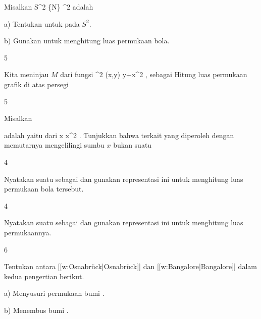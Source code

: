 {}
{

Misalkan
\maabbdisp {\alpha} {S^2 \setminus \{N\}} { \R^2
} {}
adalah

a) Tentukan
\mathl{\alpha_* \omega}{} untuk
pada $S^2$.

b) Gunakan
\mathl{\alpha_* \omega}{} untuk menghitung luas permukaan bola.

}
{} {}


{5}
{

Kita meninjau
$M$ dari fungsi
\maabbeledisp {\psi} {\R^2} {\R
} {(x,y)} { y+x^2
} {,}
sebagai
Hitung luas permukaan grafik di atas persegi

}
{} {}

{5}
{

Misalkan

 {  }

adalah
yaitu
dari
\maabbeledisp {} {\R} {\R
} { x } { x^2
} {.}
Tunjukkan bahwa
terkait yang diperoleh dengan memutarnya mengelilingi sumbu $x$ bukan suatu

}
{} {}

{4}
{

Nyatakan suatu
 sebagai
 dan gunakan representasi ini untuk menghitung luas permukaan bola tersebut.

}
{} {}

{4}
{

Nyatakan suatu
 sebagai
 dan gunakan representasi ini untuk menghitung luas permukaannya.

}
{} {}

{6}
{

Tentukan  antara [[w:Osnabrück|Osnabrück]] dan [[w:Bangalore|Bangalore]]
 {} {}
dalam kedua pengertian berikut.

a) Menyusuri permukaan bumi
 {} {.}

b) Menembus bumi
 {} {.}

}
{} {}

